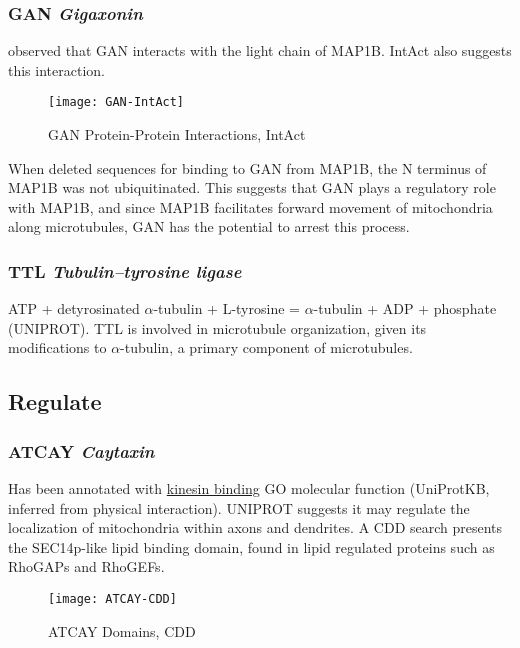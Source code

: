 \subsubsection{GAN \textit{Gigaxonin}}

\cite{Allen2005} observed that GAN interacts with the light chain of MAP1B.
IntAct also suggests this interaction.

\begin{figure}[h]
  \centering
  \texttt{[image: GAN-IntAct]}
  \caption{GAN Protein-Protein Interactions, IntAct}
\end{figure}

When \citeauthor{Allen2005} deleted sequences for binding to GAN from MAP1B,
the N terminus of MAP1B was not ubiquitinated. This suggests that GAN plays
a regulatory role with MAP1B, and since MAP1B facilitates forward movement
of mitochondria along microtubules, GAN has the potential to arrest this
process.

\subsubsection{TTL \textit{Tubulin--tyrosine ligase}}

ATP + detyrosinated $\alpha$-tubulin + L-tyrosine = $\alpha$-tubulin + ADP +
phosphate (UNIPROT). TTL is involved in microtubule organization, given its
modifications to $\alpha$-tubulin, a primary component of microtubules.

\subsection{Regulate}

\subsubsection{ATCAY \textit{Caytaxin}}

Has been annotated with \href{http://www.ebi.ac.uk/QuickGO/GTerm?id=GO:0019894}{kinesin binding}
GO molecular function (UniProtKB, inferred from physical interaction).
UNIPROT suggests it may regulate the localization of mitochondria within
axons and dendrites. A CDD search presents the SEC14p-like lipid binding
domain, found in lipid regulated proteins such as RhoGAPs and RhoGEFs.

\begin{figure}[h]
  \texttt{[image: ATCAY-CDD]}
  \caption{ATCAY Domains, CDD}
\end{figure}

